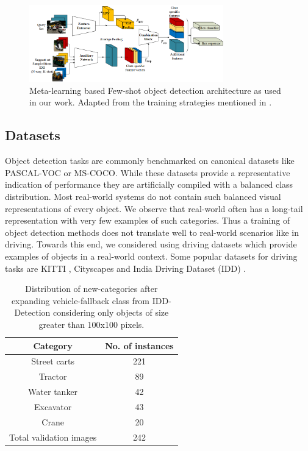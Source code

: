 \documentclass[letterpaper]{article} %
\begin{document}
\begin{figure}[t]
      \centering
      \includegraphics[width=0.75\textwidth,keepaspectratio]{aux_net}
      \caption{Meta-learning based Few-shot object detection architecture as used in our work. Adapted from the training strategies mentioned in \cite{metarcnn,addfeat}.}
      \label{fig_aux}
\end{figure}

\subsection{Datasets}
\label{approach:data}
Object detection tasks are commonly benchmarked on canonical datasets like PASCAL-VOC or MS-COCO. While these datasets provide a representative indication of performance they are artificially compiled with a balanced class distribution. Most real-world systems do not contain such balanced visual representations of every object.  We observe that real-world often has a long-tail representation with very few examples of such categories. Thus a training of object detection methods does not translate well to real-world scenarios like in driving. Towards this end, we considered  using driving datasets which provide examples of objects in a real-world context. Some popular datasets for driving tasks are KITTI \cite{kitti}, Cityscapes \cite{city} and India Driving Dataset (IDD) \cite{idd}. 

\begin{table} [t]
    \caption{Distribution of new-categories after expanding vehicle-fallback class from IDD-Detection considering only objects of size greater than 100x100 pixels.}
    \centering
    \begin{tabular}{ c | c} 
          \hline
          Category          & No. of instances \\
          \hline
          Street carts      & 221 \\
          Tractor           & 89 \\
          Water tanker      & 42 \\
          Excavator         & 43 \\
          Crane             & 20 \\
          \hline
          Total validation images &242\footnotemark\\
          \hline
    \end{tabular}
    \label{tableI}
\end{table}
\end{document}
